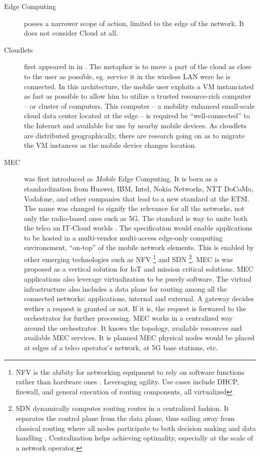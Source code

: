 \documentclass[11pt]{sdm}
\begin{document}
\begin{description}
	\item[Edge Computing] posses a narrower scope of action, limited to the edge of the network. It does not consider Cloud at all.
		
	\item[Cloudlets] first appeared in \cite{satyanarayanan_case_2009} in . The metaphor is to move a part of the cloud as close to the user as possible, eg. service it in the wireless LAN were he is connected. In this architecture, the mobile user exploits a \gls{VM} instanciated as fast as possible to allow him to utilize a trusted resource-rich computer -- or cluster of computers. This computer -- a mobility enhanced small-scale cloud data center located at the edge -- is required be ``well-connected'' to the Internet and available for use by nearby mobile devices. As cloudlets are distributed geographically, there are research going on as to migrate the \gls{VM} instances as the mobile device changes location.
	
	\item[\acrfull{MEC}] was first introduced as \emph{Mobile} Edge Computing. It is born as a standardization from Huawei, IBM, Intel,
	Nokia Networks, NTT DoCoMo, Vodafone, and other companies that lead to a new standard at the \gls{ETSI}. The name was changed to signify the relevance for all the networks, not only the radio-based ones such as 5G. The standard is way to unite both the telco an IT-Cloud worlds \cite{dahmen-lhuissier_etsi_nodate-1}. The specification would enable applications to be hosted in a multi-vendor multi-access edge-only computing environement, ``on-top'' of the mobile network elements. This is enabled by other emerging technologies such as \gls{NFV} \footnote{\acrfull{NFV} is the abibity for networking equipment to rely on software functions rather than hardware ones \cite{redhat_what_2019}. Leveraging agility. Use cases include DHCP, firewall, and general execution of routing components, all virtualized} and \gls{SDN} \footnote{\acrfull{SDN} dynamically computes routing routes in a centralized fashion. It separates the control plane from the data plane, thus sailing away from classical routing where all nodes participate to both decision making and data handling \cite{redhat_what_2019}. Centralization helps achieving optimality, especially at the scale of a network operator.}. \gls{MEC} is was proposed as a vertical solution for \gls{IoT} and mission critical solutions. \gls{MEC} applications also leverage virtualization to be purely software. The virtual infrastructure also includes a data plane for routing among all the connected networks: applications, internal and external. A gateway decides wether a request is granted or not. If it is, the request is forwared to the orchestrator for further processing. \gls{MEC} works in a centralized way around the orchestrator. It knows the topology, available resources and available \gls{MEC} services. It is planned \gls{MEC} physical nodes would be placed at edges of a telco operator's network, at 5G base stations, etc.
	

\end{description}
\end{document}
